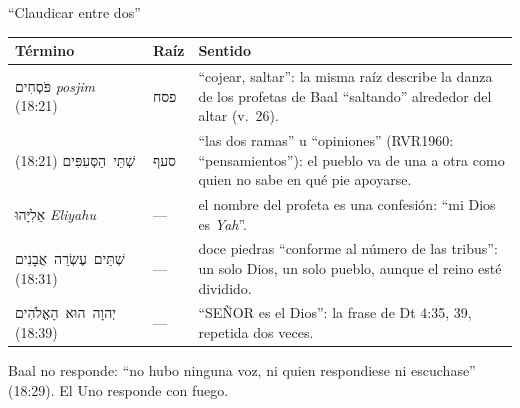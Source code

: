 \documentclass[hyperref={bookmarks=false},aspectratio=169]{beamer}
\newcommand{\heb}[1]{\mbox{\foreignlanguage{hebrew}{#1}}}
\newcommand{\SENOR}{S{\fontsize{0.78em}{1em}\selectfont EÑOR}}
\begin{document}
\begin{frame}{``Claudicar entre dos''}
\scriptsize\renewcommand{\arraystretch}{1.15}
\begin{tabular}{@{}>{\RaggedRight\arraybackslash}p{2.9cm}>{\RaggedRight\arraybackslash}p{1.0cm}>{\RaggedRight\arraybackslash}p{7.9cm}@{}}
\toprule
\textbf{Término} & \textbf{Raíz} & \textbf{Sentido} \\ \midrule
\heb{פֹּסְחִים} \emph{posjim} (18:21) & \heb{פסח} & ``cojear, saltar'': la misma raíz describe la danza de los profetas de Baal ``saltando'' alrededor del altar (v.~26). \\
\heb{שְׁתֵּי הַסְּעִפִּים} (18:21) & \heb{סעף} & ``las dos ramas'' u ``opiniones'' (RVR1960: ``pensamientos''): el pueblo va de una a otra como quien no sabe en qué pie apoyarse. \\
\heb{אֵלִיָּהוּ} \emph{Eliyahu} & --- & el nombre del profeta es una confesión: ``mi Dios es \emph{Yah}''. \\
\heb{שְׁתֵּים עֶשְׂרֵה אֲבָנִים} (18:31) & --- & doce piedras ``conforme al número de las tribus'': un solo Dios, un solo pueblo, aunque el reino esté dividido. \\
\heb{יְהוָה הוּא הָאֱלֹהִים} (18:39) & --- & ``\SENOR{} es el Dios'': la frase de Dt 4:35, 39, repetida dos veces. \\
\bottomrule
\end{tabular}\par\medskip
\small Baal no responde: ``no hubo ninguna voz, ni quien respondiese ni escuchase'' (18:29). El Uno responde con fuego.
\end{frame}
\end{document}
